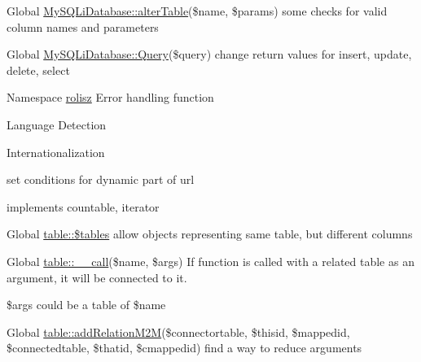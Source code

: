 \label{todo__todo000004}
\hypertarget{todo__todo000004}{}
 
\begin{DoxyDescription}
\item[Global \hyperlink{class_my_s_q_li_database_aa8cf3e2be109e548bed6980622fffb41}{MySQLiDatabase::alterTable}(\$name, \$params) ]some checks for valid column names and parameters 
\end{DoxyDescription}

\label{todo__todo000003}
\hypertarget{todo__todo000003}{}
 
\begin{DoxyDescription}
\item[Global \hyperlink{class_my_s_q_li_database_aebc962126fd37fd3478c4689156d5f83}{MySQLiDatabase::Query}(\$query) ]change return values for insert, update, delete, select 
\end{DoxyDescription}

\label{todo__todo000001}
\hypertarget{todo__todo000001}{}
 
\begin{DoxyDescription}
\item[Namespace \hyperlink{namespacerolisz}{rolisz} ]Error handling function 

Language Detection 

Internationalization 

set conditions for dynamic part of url 

implements countable, iterator 
\end{DoxyDescription}

\label{todo__todo000005}
\hypertarget{todo__todo000005}{}
 
\begin{DoxyDescription}
\item[Global \hyperlink{classtable_a3d332a3c374a53802495dcb045f6133f}{table::\$tables} ]allow objects representing same table, but different columns 
\end{DoxyDescription}

\label{todo__todo000006}
\hypertarget{todo__todo000006}{}
 
\begin{DoxyDescription}
\item[Global \hyperlink{classtable_af231e86ad32039b9573ae228db5a29fa}{table::\_\-\_\-call}(\$name, \$args) ]If function is called with a related table as an argument, it will be connected to it. 

\$args could be a table of \$name 
\end{DoxyDescription}

\label{todo__todo000008}
\hypertarget{todo__todo000008}{}
 
\begin{DoxyDescription}
\item[Global \hyperlink{classtable_a29c2012e7cc6b182cc3ca63acfc324b9}{table::addRelationM2M}(\$connectortable, \$thisid, \$mappedid, \$connectedtable, \$thatid, \$cmappedid) ]find a way to reduce arguments 
\end{DoxyDescription}